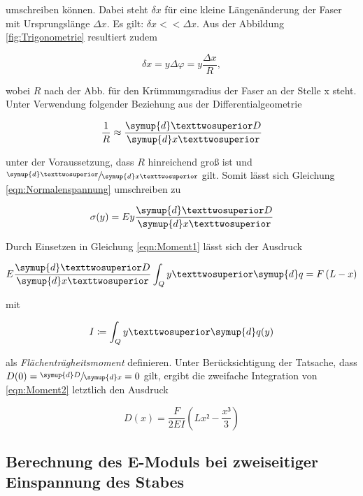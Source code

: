 \noindent umschreiben können. Dabei steht $\delta x$ für eine kleine Längenänderung der Faser mit Ursprungslänge $\Delta x$. Es gilt:
$\delta x << \Delta x$. Aus der Abbildung \ref{fig:Trigonometrie} resultiert zudem 

\begin{equation*}
    \delta x = y\Delta\varphi = y\frac{\Delta x}{R},
\end{equation*}

\noindent wobei $R$ nach der Abb. für den Krümmungsradius der Faser an der Stelle x steht. Unter Verwendung folgender Beziehung aus der 
Differentialgeometrie

\begin{equation*}
    \frac{1}{R} \approx \frac{\symup{d}²D}{\symup{d}x²}
\end{equation*}

\noindent unter der Voraussetzung, dass $R$ hinreichend groß ist und $\sfrac{\symup{d}²}{\symup{d}x²}$ gilt. Somit lässt sich
Gleichung \eqref{eqn:Normalenspannung} umschreiben zu

\begin{equation*}
    \sigma(y) = Ey\frac{\symup{d}²D}{\symup{d}x²}
\end{equation*}

\noindent Durch Einsetzen in Gleichung \eqref{eqn:Moment1} lässt sich der Ausdruck

\begin{equation}
\label{eqn:Moment2}
    E\frac{\symup{d}²D}{\symup{d}x²}\int_Q y²\symup{d}q = F\left(L-x\right)
\end{equation}

\noindent mit

\begin{equation*}
    I \coloneqq \int_Q y²\symup{d}q(y)
\end{equation*}

\noindent als \emph{Flächenträgheitsmoment} definieren. Unter Berücksichtigung der Tatsache, dass $D(0) = \sfrac{\symup{d}D}{\symup{d}x} = 0$ gilt, ergibt die zweifache Integration
von \eqref{eqn:Moment2} letztlich den Ausdruck

\begin{equation}
    D(x) = \frac{F}{2EI}\left(Lx²-\frac{x³}{3}\right)
    \label{eqn:Biegung_einseitig}
\end{equation}

\subsection{Berechnung des E-Moduls bei zweiseitiger Einspannung des Stabes}

